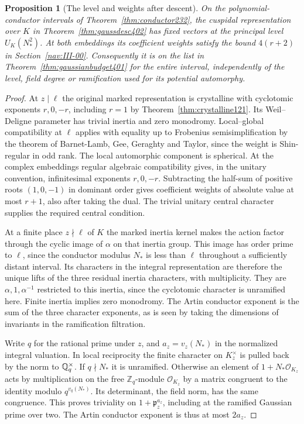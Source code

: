 \documentclass[a4paper,11pt]{article}
\newtheorem{proposition}{Proposition}[section]
\theoremstyle{definition}
\theoremstyle{remark}
\newcommand{\ZZ}{\mathbb Z}\newcommand{\ord}{\operatorname{ord}}
\numberwithin{equation}{section}
\begin{document}
\begin{proposition}[The level and weights after descent]\leavevmode
\label{prop:gausslevel402}
On the polynomial-conductor intervals of
Theorem~\ref{thm:conductor232}, the cuspidal representation over
\(K\) in Theorem~\ref{thm:gaussdesc402} has fixed vectors at the
principal level \(U_K(N_*^2)\). At both embeddings its coefficient
weights satisfy the bound \(4(r+2)\) in Section~\ref{nav:III-00}.
Consequently it is on the list in Theorem~\ref{thm:gaussianbudget401}
for the entire interval, independently of the level, field degree
or ramification used for its potential automorphy.
\end{proposition}
\begin{proof}
At \(z\mid\ell\) the original marked representation is
crystalline with cyclotomic exponents \(r,0,-r\), including
\(r=1\) by Theorem~\ref{thm:crystalline121}. Its Weil--Deligne
parameter has trivial inertia and zero monodromy. Local--global
compatibility at \(\ell\) applies with equality up to Frobenius
semisimplification by the theorem of Barnet-Lamb, Gee, Geraghty
and Taylor, since the weight is Shin-regular in odd rank. The
local automorphic component is spherical. At the complex
embeddings regular algebraic compatibility gives, in the
unitary convention, infinitesimal exponents \(r,0,-r\).
Subtracting the half-sum of positive roots \((1,0,-1)\) in
dominant order gives coefficient weights of absolute value at
most \(r+1\), also after taking the dual. The trivial unitary
central character supplies the required central condition.
\,\cite{VIII-VI-lgp361,VIII-VI-V-shin}

At a finite place \(z\nmid\ell\) of \(K\) the marked inertia
kernel makes the action factor through the cyclic image of
\(\alpha\) on that inertia group. This image has order prime to
\(\ell\), since the conductor modulus \(N_*\) is less than
\(\ell\) throughout a sufficiently distant interval. Its
characters in the integral representation are therefore the
unique lifts of the three residual inertia characters, with
multiplicity. They are \(\alpha,1,\alpha^{-1}\) restricted to
this inertia, since the cyclotomic character is unramified
here. Finite inertia implies zero monodromy. The Artin conductor
exponent is the sum of the three character exponents, as is
seen by taking the dimensions of invariants in the ramification
filtration.

Write \(q\) for the rational prime under \(z\), and
\(a_z=v_z(N_*)\) in the normalized integral valuation. In local
reciprocity the finite character on \(K_z^\times\) is pulled back
by the norm to \(\mathbb Q_q^\times\). If \(q\nmid N_*\) it is
unramified. Otherwise an element of \(1+N_*\mathcal O_{K_z}\)
acts by multiplication on the free \(\ZZ_q\)-module
\(\mathcal O_{K_z}\) by a matrix congruent to the identity modulo
\(q^{v_q(N_*)}\). Its determinant, the field norm, has the same
congruence. This proves triviality on \(1+\mathfrak p_z^{a_z}\),
including at the ramified Gaussian prime over two. The Artin
conductor exponent is thus at most \(2a_z\).


\end{proof}
\end{document}

